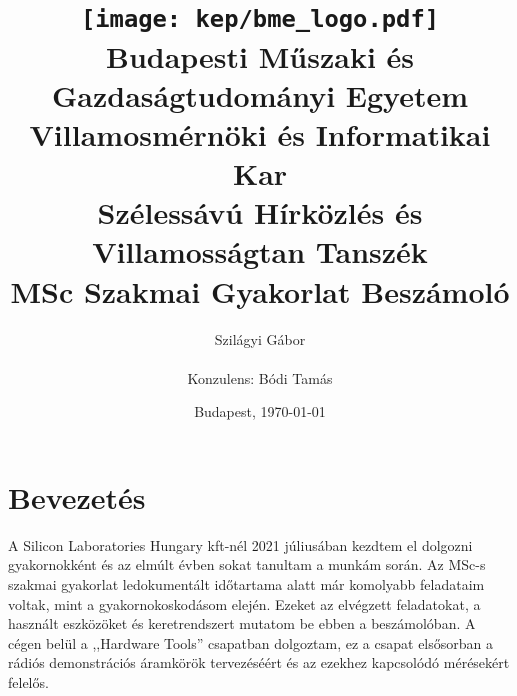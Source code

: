 \documentclass[a4paper,12pt,titlepage]{article}
\title{
\centering
\texttt{[image: kep/bme\_logo.pdf]} \\
\large{\textbf{Budapesti Műszaki és Gazdaságtudományi Egyetem}\\
\textbf{Villamosmérnöki és Informatikai Kar}\\
\textbf{Szélessávú Hírközlés és Villamosságtan Tanszék}}\\
\vspace{6cm}
\huge{\textbf{MSc Szakmai Gyakorlat Beszámoló}} \\
\vspace{2cm}}
\author{Szilágyi Gábor \\\vspace{2cm}\\ Konzulens: Bódi Tamás}
\date{Budapest, \today}
\begin{document}
	\maketitle
	\section{Bevezetés}
	A Silicon Laboratories Hungary kft-nél 2021 júliusában kezdtem el dolgozni gyakornokként és az elmúlt évben sokat tanultam a munkám során. Az MSc-s szakmai gyakorlat ledokumentált időtartama alatt már komolyabb feladataim voltak, mint a gyakornokoskodásom elején. Ezeket az elvégzett feladatokat, a használt eszközöket és keretrendszert mutatom be ebben a beszámolóban. A cégen belül a ,,Hardware Tools'' csapatban dolgoztam, ez a csapat elsősorban a rádiós demonstrációs áramkörök tervezéséért és az ezekhez kapcsolódó mérésekért felelős.
\end{document}
